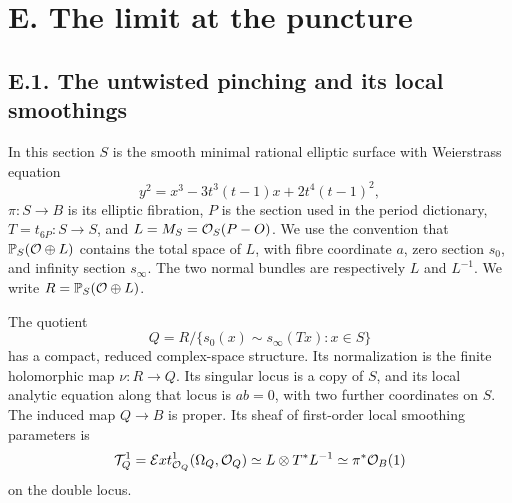 \section{E. The limit at the puncture}
\subsection{E.1. The untwisted pinching and its local smoothings}

In this section $S$ is the smooth minimal rational elliptic surface with
Weierstrass equation
\[
 y^2=x^3-3t^3(t-1)x+2t^4(t-1)^2,
\]
$\pi:S\to B$ is its elliptic fibration, $P$ is the section used in the
period dictionary, $T=t_{6P}:S\to S$, and $L=M_S=\mathcal O_S(P-O)$.
We use the convention that $\mathbb P_S(\mathcal O\oplus L)$ contains the total
space of $L$, with fibre coordinate $a$, zero section $s_0$, and infinity
section $s_\infty$. The two normal bundles are respectively $L$ and
$L^{-1}$. We write $R=\mathbb P_S(\mathcal O\oplus L)$.

\begin{proposition}[E.1.1; Proved]\label{st:E.1.1}
The quotient
\[
 Q=R/\{s_0(x)\sim s_\infty(Tx):x\in S\}
\]
has a compact, reduced complex-space structure. Its normalization is
the finite holomorphic map $\nu:R\to Q$. Its singular locus is a copy
of $S$, and its local analytic equation along that locus is $ab=0$,
with two further coordinates on $S$. The induced map $Q\to B$ is
proper. Its sheaf of first-order local smoothing parameters is
\[
 \mathcal T^1_Q=\mathcal Ext^1_{\mathcal O_Q}(\Omega_Q,\mathcal O_Q)
       \simeq L\otimes T^*L^{-1}\simeq\pi^*\mathcal O_B(1)
\]
on the double locus.
\end{proposition}

